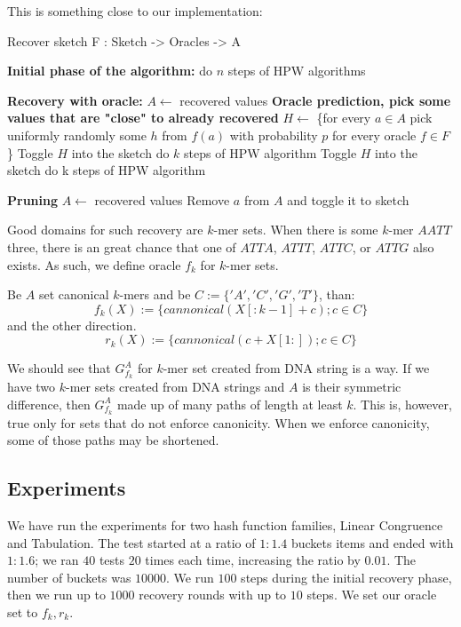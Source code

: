 This is something close to our implementation:
\begin{algorithm}
\caption{Recover sketch F : Sketch -> Oracles -> A}
\begin{algorithmic}[1]
\State \textbf{Initial phase of the algorithm:}
\State do $n$ steps of HPW algorithms

\State \textbf{Recovery with oracle:}
    \State $A \gets$ recovered values
    \State \textbf{Oracle prediction, pick some values that are "close" to already recovered}
    \State $H \gets$ \{for every $a \in A$ pick uniformly randomly some $h$ from $f(a)$ with probability $p$ for every oracle $f \in F$\}
    \State Toggle $H$ into the sketch
    \State do $k$ steps of HPW algorithm
    \State Toggle $H$ into the sketch 
    \State do k steps of HPW algorithm

    \State \textbf{Pruning}
            \State $A \gets$ recovered values
                \State Remove $a$ from $A$ and toggle it to sketch
            \EndFor
        \EndIf
    \EndIf
\EndFor
\end{algorithmic}
\end{algorithm}

Good domains for such recovery are $k$-mer sets. When there is some $k$-mer $AATT$ three, there is an great chance that one of $ATTA$, $ATTT$, $ATTC$, or $ATTG$ also exists.
As such, we define oracle $f_k$ for $k$-mer sets. 
\begin{defn}
Be $A$ set canonical $k$-mers and be $C := \{'A','C','G','T'\}$, than:
    $$f_k(X) :=  \{cannonical(X[:k-1] + c) ; c \in C\}$$
    and the other direction.
    $$r_k(X) :=  \{cannonical(c + X[1:]) ; c \in C\}$$

\end{defn}

We should see that $G^{A}_{f_k}$ for $k$-mer set created from DNA string is a way. If we have two $k$-mer sets created from DNA strings and $A$ is their symmetric difference, then $G^{A}_{f_k}$ made up of many paths of length at least $k$. This is, however, true only for sets that do not enforce canonicity. When we enforce canonicity, some of those paths may be shortened.
\subsection{Experiments}

We have run the experiments for two hash function families, Linear Congruence and Tabulation. The test started at a ratio of $1:1.4$ buckets items and ended with $1:1.6$; we ran $40$ tests $20$ times each time, increasing the ratio by $0.01$. The number of buckets was $10000$. We run $100$ steps during the initial recovery phase, then we run up to $1000$ recovery rounds with up to $10$ steps. We set our oracle set to ${f_k, r_k}$.

